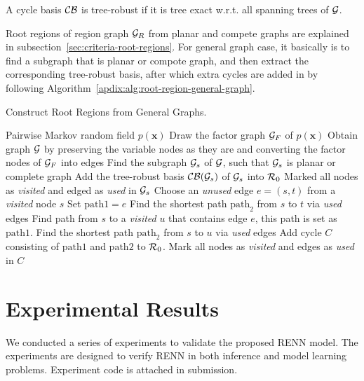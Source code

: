 \begin{definition}
  A cycle basis $\mathcal{C}\mathcal{B}$ is tree-robust if it is tree exact w.r.t. all spanning trees of $\mathcal{G}$.
\end{definition}

Root regions of region graph $\mathcal{G}_R$ from planar and compete graphs are explained in subsection~\ref{sec:criteria-root-regions}. For general graph case, it basically is to find a subgraph that is planar or compote graph, and then extract the corresponding tree-robust basis, after which extra cycles are added in by following Algorithm~\ref{apdix:alg:root-region-general-graph}.
\begin{algorithm}[tb]
  \caption{Construct Root Regions from General Graphs.}
  \label{apdix:alg:root-region-general-graph}
  \begin{algorithmic}
     Pairwise Markov random field $p(\bm{x})$
    \STATE Draw the factor graph $\mathcal{G}_F$ of $p(\bm{x})$
    \STATE Obtain graph $\mathcal{G}$ by preserving the variable nodes as they are and converting the factor nodes of $\mathcal{G}_F$ into edges
    \STATE Find the subgraph $\mathcal{G}_s$ of $\mathcal{G}$, such that $\mathcal{G}_s$ is planar or complete graph
    \STATE Add the tree-robust basis $\mathcal{C}\mathcal{B}(\mathcal{G}_s)$ of $\mathcal{G}_s$ into $\mathcal{R}_0$
    \STATE Marked all nodes as \textit{visited} and edged as \textit{used} in $\mathcal{G}_s$
    \REPEAT
    \STATE Choose an \textit{unused} edge $e = (s,t)$ from a \textit{visited} node $s$
    \STATE Set $\mathrm{path1} = e$
    \STATE Find the shortest path $\mathrm{path}_2$ from $s$ to $t$
    via \textit{used} edges
    \ELSE
    \STATE Find path from $s$ to a \textit{visited} $u$ that
    contains edge $e$, this path is set as $\mathrm{path1}$.
    \STATE Find the shortest path $\mathrm{path}_2$ from $s$ to $u$
    via \textit{used} edges
    \ENDIF
    \STATE Add cycle $C$ consisting of $\mathrm{path1}$ and
    $\mathrm{path2}$ to $\mathcal{R}_0$.
    \STATE Mark all nodes as \textit{visited} and edges as
    \textit{used} in $C$
  \end{algorithmic}
\end{algorithm}



\section{Experimental Results}

We conducted a series of experiments to validate the proposed RENN model. The experiments are designed to verify RENN in both inference and model learning problems. Experiment code is attached in submission.



